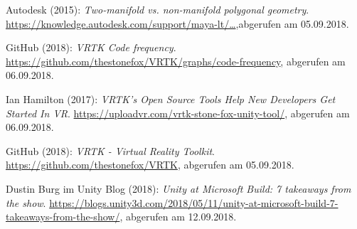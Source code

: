 \begin{thebibliography}{999}
\label{MayaDocu}
Autodesk (2015): \textit{Two-manifold vs. non-manifold polygonal geometry}.\newline
\href{https://knowledge.autodesk.com/support/maya-lt/learn-explore/caas/CloudHelp/cloudhelp/2015/ENU/MayaLT/files/Polygons-overview-Twomanifold-vs--nonmanifold-polygonal-geometry-htm.html}{https://knowledge.autodesk.com/support/maya-lt/\dots},\newline abgerufen am 05.09.2018.

\label{code-frequency}
GitHub (2018): \textit{VRTK Code frequency}.\newline
\url{https://github.com/thestonefox/VRTK/graphs/code-frequency},\newline 
abgerufen am 06.09.2018.

\label{Ian}
Ian Hamilton (2017): \textit{VRTK’s Open Source Tools Help New Developers Get Started In VR}.\newline
\url{https://uploadvr.com/vrtk-stone-fox-unity-tool/},\newline 
abgerufen am 06.09.2018.

\label{VRTK}
GitHub (2018): \textit{VRTK - Virtual Reality Toolkit}.\newline
\url{https://github.com/thestonefox/VRTK},\newline 
abgerufen am 05.09.2018.

\label{burg}
Dustin Burg im Unity Blog (2018): \textit{Unity at Microsoft Build: 7 takeaways from the show}.\newline
\url{https://blogs.unity3d.com/2018/05/11/unity-at-microsoft-build-7-takeaways-from-the-show/},\newline 
abgerufen am 12.09.2018.


\end{thebibliography}
